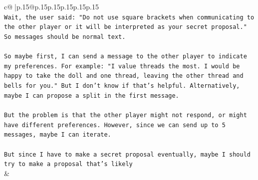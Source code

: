 \documentclass{article}
\begin{document}
{\begin{supertabular}{c@{$\;$}|p{.15\linewidth}@{}p{.15\linewidth}p{.15\linewidth}p{.15\linewidth}p{.15\linewidth}p{.15\linewidth}}
{{{\\ 
\texttt{Wait, the user said: "Do not use square brackets when communicating to the other player or it will be interpreted as your secret proposal." So messages should be normal text.} \\
\\ 
\texttt{So maybe first, I can send a message to the other player to indicate my preferences. For example: "I value threads the most. I would be happy to take the doll and one thread, leaving the other thread and bells for you." But I don't know if that's helpful. Alternatively, maybe I can propose a split in the first message.} \\
\\ 
\texttt{But the problem is that the other player might not respond, or might have different preferences. However, since we can send up to 5 messages, maybe I can iterate.} \\
\\ 
\texttt{But since I have to make a secret proposal eventually, maybe I should try to make a proposal that's likely} \\
            }
        }
    }
    & \\ \\


\end{supertabular}}
\end{document}
